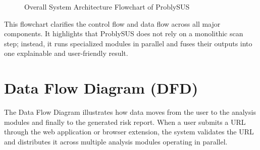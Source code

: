 \begin{figure}[!htbp]
\centering
{}
\caption{Overall System Architecture Flowchart of ProblySUS}
\label{fig:overall_architecture_flow}
\end{figure}

This flowchart clarifies the control flow and data flow across all major components. It highlights that ProblySUS does not rely on a monolithic scan step; instead, it runs specialized modules in parallel and fuses their outputs into one explainable and user-friendly result.

\section{Data Flow Diagram (DFD)}

The Data Flow Diagram illustrates how data moves from the user to the analysis modules and finally to the generated risk report. When a user submits a URL through the web application or browser extension, the system validates the URL and distributes it across multiple analysis modules operating in parallel.


